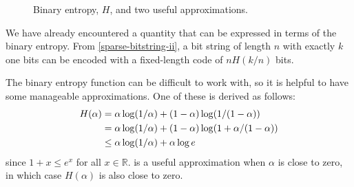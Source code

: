 \documentclass[prodmode,acmcsur]{acmsmall}
\begin{document}
\begin{figure}
  \caption{Binary entropy, $H$, and two useful approximations.}
\end{figure}

We have already encountered a quantity that can be
expressed in terms of the binary entropy.  From
\eqref{sparse-bitstring-ii}, a bit string of length $n$ with
exactly $k$ one bits can be encoded with a fixed-length code of 
$nH(k/n)$ bits.

The binary entropy function can be difficult to work with, so it is
helpful to have some manageable approximations.  One of these is
derived as follows:
\begin{align}
  H(\alpha) & = \alpha\log(1/\alpha) + (1-\alpha)\log(1/(1-\alpha)) \notag \\
            & = \alpha\log(1/\alpha) + (1-\alpha)\log(1+\alpha/(1-\alpha)) \notag \\
            & \le \alpha\log(1/\alpha) + \alpha\log e \eqlabel{entropy-i} 
\end{align}
since $1+x\le e^x$ for all $x\in\mathbb{R}$.  is a
useful approximation when $\alpha$ is close to zero, in which case 
$H(\alpha)$ is also close to zero.
\end{document}
